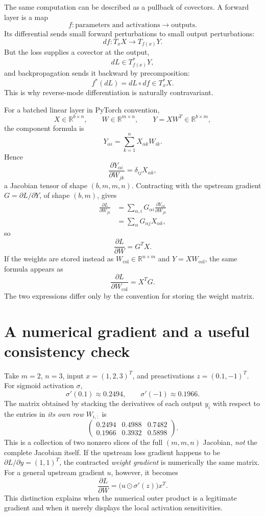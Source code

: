 The same computation can be described as a pullback of covectors.  A forward layer is a map
\[
  f:\text{parameters and activations}\longrightarrow \text{outputs}.
\]
Its differential sends small forward perturbations to small output perturbations:
\[
  df:T_xX\to T_{f(x)}Y.
\]
But the loss supplies a covector at the output,
\[
  dL\in T_{f(x)}^*Y,
\]
and backpropagation sends it backward by precomposition:
\[
  f^*(dL)=dL\circ df\in T_x^*X.
\]
This is why reverse-mode differentiation is naturally contravariant.

For a batched linear layer in PyTorch convention,
\[
  X\in\mathbb R^{b\times n},\qquad
  W\in\mathbb R^{m\times n},\qquad
  Y=XW^T\in\mathbb R^{b\times m},
\]
the component formula is
\[
  Y_{\alpha i}=\sum_{k=1}^n X_{\alpha k}W_{ik}.
\]
Hence
\[
  \frac{\partial Y_{\alpha i}}{\partial W_{jk}}
  =
  \delta_{ij}X_{\alpha k},
\]
a Jacobian tensor of shape \((b,m,m,n)\).  Contracting with the upstream gradient \(G=\partial L/\partial Y\), of shape \((b,m)\), gives
\[
\begin{aligned}
  \frac{\partial L}{\partial W_{jk}}
  &=
  \sum_{\alpha,i}G_{\alpha i}
  \frac{\partial Y_{\alpha i}}{\partial W_{jk}}\\
  &=
  \sum_{\alpha}G_{\alpha j}X_{\alpha k},
\end{aligned}
\]
so
\[
  \frac{\partial L}{\partial W}=G^TX.
\]
If the weights are stored instead as \(W_{\mathrm{col}}\in\mathbb R^{n\times m}\) and \(Y=XW_{\mathrm{col}}\), the same formula appears as
\[
  \frac{\partial L}{\partial W_{\mathrm{col}}}=X^TG.
\]
The two expressions differ only by the convention for storing the weight matrix.

\section{A numerical gradient and a useful consistency check}

Take \(m=2\), \(n=3\), input \(x=(1,2,3)^T\), and preactivations \(z=(0.1,-1)^T\). For sigmoid activation \(\sigma\),
\[
 \sigma'(0.1)\approx0.2494,\qquad \sigma'(-1)\approx0.1966.
\]
The matrix obtained by stacking the derivatives of each output \(y_i\) with respect to the entries in \emph{its own row} \(W_{i,:}\) is
\[
 \begin{pmatrix}0.2494&0.4988&0.7482\\
                 0.1966&0.3932&0.5898\end{pmatrix}.
\]
This is a collection of two nonzero slices of the full \((m,m,n)\) Jacobian, \emph{not} the complete Jacobian itself. If the upstream loss gradient happens to be \(\partial L/\partial y=(1,1)^T\), the contracted \emph{weight gradient} is numerically the same matrix. For a general upstream gradient \(u\), however, it becomes
\[
 \frac{\partial L}{\partial W}
 =\bigl(u\odot\sigma'(z)\bigr)x^T.
\]
This distinction explains when the numerical outer product is a legitimate gradient and when it merely displays the local activation sensitivities.

